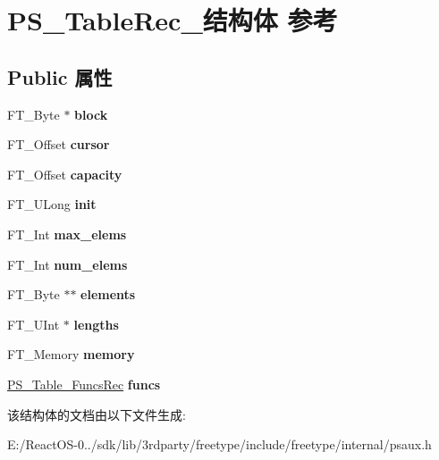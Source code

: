 \hypertarget{struct_p_s___table_rec__}{}\section{P\+S\+\_\+\+Table\+Rec\+\_\+结构体 参考}
\label{struct_p_s___table_rec__}
\subsection*{Public 属性}
\begin{DoxyCompactItemize}
\item 
\mbox{\label{struct_p_s___table_rec___a6caa7b6aef2ba7e28d260b6a87782723}} 
F\+T\+\_\+\+Byte $\ast$ {\bfseries block}
\item 
\mbox{\label{struct_p_s___table_rec___a8725d30f75b6dc785b988ed689ac7e58}} 
F\+T\+\_\+\+Offset {\bfseries cursor}
\item 
\mbox{\label{struct_p_s___table_rec___acf6d4f15ca247960cc7823b73d3c66bf}} 
F\+T\+\_\+\+Offset {\bfseries capacity}
\item 
\mbox{\label{struct_p_s___table_rec___a599789092ebf74a09033a6380c4c2a7c}} 
F\+T\+\_\+\+U\+Long {\bfseries init}
\item 
\mbox{\label{struct_p_s___table_rec___a8594ec199ad792ed7ffd558806a7d23b}} 
F\+T\+\_\+\+Int {\bfseries max\+\_\+elems}
\item 
\mbox{\label{struct_p_s___table_rec___a26706016251497b19039f2c002c4e9d5}} 
F\+T\+\_\+\+Int {\bfseries num\+\_\+elems}
\item 
\mbox{\label{struct_p_s___table_rec___a1967f81d98ea65a605968a7e1e5c51c3}} 
F\+T\+\_\+\+Byte $\ast$$\ast$ {\bfseries elements}
\item 
\mbox{\label{struct_p_s___table_rec___aeb8384606eec4117600c224dd8052f2b}} 
F\+T\+\_\+\+U\+Int $\ast$ {\bfseries lengths}
\item 
\mbox{\label{struct_p_s___table_rec___a061872add9c6d1af67cfdfac5ce2b80d}} 
F\+T\+\_\+\+Memory {\bfseries memory}
\item 
\mbox{\label{struct_p_s___table_rec___adced5ad36107c90012e9fafa55eab5b9}} 
\hyperlink{struct_p_s___table___funcs_rec__}{P\+S\+\_\+\+Table\+\_\+\+Funcs\+Rec} {\bfseries funcs}
\end{DoxyCompactItemize}


该结构体的文档由以下文件生成\+:\begin{DoxyCompactItemize}
\item 
E\+:/\+React\+O\+S-\/0../sdk/lib/3rdparty/freetype/include/freetype/internal/psaux.\+h\end{DoxyCompactItemize}
